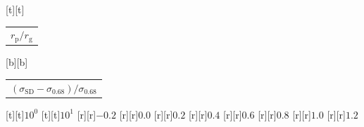 %    
%
%
\begin{psfrags}%
\psfragscanon%
%
[t][t]{\color[rgb]{0,0,0}\setlength{\tabcolsep}{0pt}\begin{tabular}{c}{\Large$r_\mathrm{p}/r_\mathrm{g}$}\end{tabular}}%
[b][b]{\color[rgb]{0,0,0}\setlength{\tabcolsep}{0pt}\begin{tabular}{c}{\Large$(\sigma_\mathrm{SD}-\sigma_{0.68})/\sigma_{0.68}$}\end{tabular}}%
%
[t][t]{$10^{0}$}%
[t][t]{$10^{1}$}%
%
[r][r]{$-0.2$}%
[r][r]{$0.0$}%
[r][r]{$0.2$}%
[r][r]{$0.4$}%
[r][r]{$0.6$}%
[r][r]{$0.8$}%
[r][r]{$1.0$}%
[r][r]{$1.2$}%
%
%
\end{psfrags}%
%
